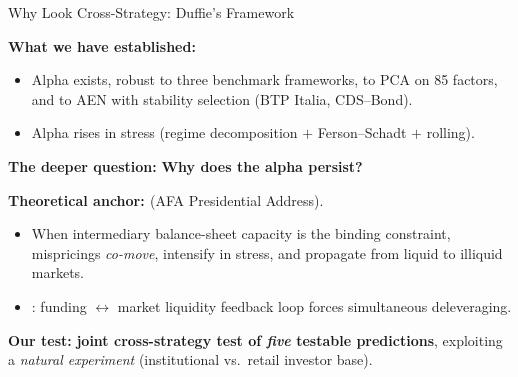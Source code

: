 \documentclass[aspectratio=169,11pt]{beamer}
\newcommand{\hlt}[1]{\textcolor{edhecred}{\textbf{#1}}}     %
\newcommand{\hltb}[1]{\textcolor{accentblue}{\textbf{#1}}}  %
\begin{document}
\begin{frame}[t]{Why Look Cross-Strategy: Duffie's Framework}
\small

\textbf{What we have established:}
\begin{itemize}\itemsep=0.05cm
  \item Alpha exists, robust to three benchmark frameworks, to PCA on 85 factors,
        and to AEN with stability selection (BTP Italia, CDS--Bond).
  \item Alpha rises in stress (regime decomposition $+$ Ferson--Schadt $+$ rolling).
\end{itemize}

\vspace{0.30cm}

\textbf{The deeper question:} \hlt{Why does the alpha persist?}

\vspace{0.30cm}

\textbf{Theoretical anchor: \citet{duffie2010presidential}} (AFA Presidential Address).

\vspace{0.10cm}
\begin{itemize}\itemsep=0.05cm
  \item When intermediary balance-sheet capacity is the binding constraint,
        mispricings \emph{co-move}, intensify in stress, and propagate from liquid to illiquid markets.
  \item \citet{brunnermeier2009market}: funding $\leftrightarrow$ market liquidity feedback
        loop forces simultaneous deleveraging.
\end{itemize}

\vspace{0.30cm}

\textbf{Our test:} \hltb{joint cross-strategy test of \emph{five} testable predictions},
exploiting a \emph{natural experiment} (institutional vs.\ retail investor base).

\end{frame}
\end{document}
